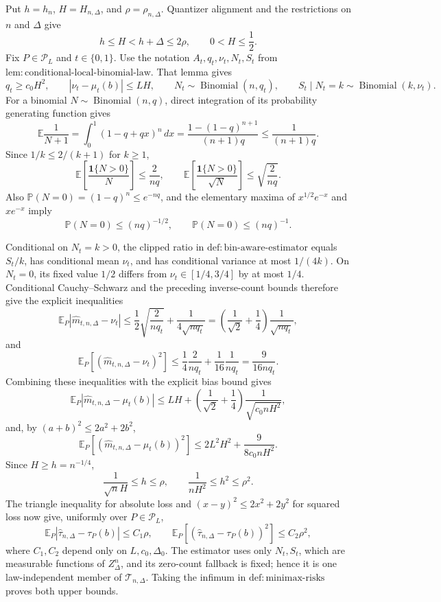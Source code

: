 Put \(h=h_n\), \(H=H_{n,\Delta}\), and \(\rho=\rho_{n,\Delta}\).  Quantizer alignment and the restrictions on \(n\) and \(\Delta\) give
\[
 h\leq H<h+\Delta\leq2\rho,
 \qquad 0<H\leq\frac12.
\]
Fix \(P\in\mathcal P_L\) and \(t\in\{0,1\}\).  Use the notation \(A_t,q_t,\nu_t,N_t,S_t\) from \(\mathrm{lem:conditional\text{-}local\text{-}binomial\text{-}law}\).  That lemma gives
\[
 q_t\geq c_0H^2,
 \qquad |\nu_t-\mu_t(b)|\leq LH,
 \qquad N_t\sim\operatorname{Binomial}(n,q_t),
 \qquad S_t\mid N_t=k\sim\operatorname{Binomial}(k,\nu_t).
\]
For a binomial \(N\sim\operatorname{Binomial}(n,q)\), direct integration of its probability generating function gives
\[
 \mathbb E\frac1{N+1}
 =\int_0^1(1-q+qx)^n\,dx
 =\frac{1-(1-q)^{n+1}}{(n+1)q}
 \leq\frac1{(n+1)q}.
\]
Since \(1/k\leq2/(k+1)\) for \(k\geq1\),
\[
 \mathbb E\!\left[\frac{\mathbf1\{N>0\}}N\right]\leq\frac2{nq},
 \qquad
 \mathbb E\!\left[\frac{\mathbf1\{N>0\}}{\sqrt N}\right]\leq\sqrt{\frac2{nq}}.
\]
Also \(\mathbb P(N=0)=(1-q)^n\leq e^{-nq}\), and the elementary maxima of \(x^{1/2}e^{-x}\) and \(xe^{-x}\) imply
\[
 \mathbb P(N=0)\leq(nq)^{-1/2},
 \qquad
 \mathbb P(N=0)\leq(nq)^{-1}.
\]

Conditional on \(N_t=k>0\), the clipped ratio in \(\mathrm{def:bin\text{-}aware\text{-}estimator}\) equals \(S_t/k\), has conditional mean \(\nu_t\), and has conditional variance at most \(1/(4k)\).  On \(N_t=0\), its fixed value \(1/2\) differs from \(\nu_t\in[1/4,3/4]\) by at most \(1/4\).  Conditional Cauchy--Schwarz and the preceding inverse-count bounds therefore give the explicit inequalities
\[
 \mathbb E_P|\widehat m_{t,n,\Delta}-\nu_t|
 \leq\frac12\sqrt{\frac2{nq_t}}+\frac1{4\sqrt{nq_t}}
 =\left(\frac1{\sqrt2}+\frac14\right)\frac1{\sqrt{nq_t}},
\]
and
\[
 \mathbb E_P[(\widehat m_{t,n,\Delta}-\nu_t)^2]
 \leq\frac14\frac2{nq_t}+\frac1{16}\frac1{nq_t}
 =\frac9{16nq_t}.
\]
Combining these inequalities with the explicit bias bound gives
\[
 \mathbb E_P|\widehat m_{t,n,\Delta}-\mu_t(b)|
 \leq LH+\left(\frac1{\sqrt2}+\frac14\right)\frac1{\sqrt{c_0nH^2}},
\]
and, by \((a+b)^2\leq2a^2+2b^2\),
\[
 \mathbb E_P[(\widehat m_{t,n,\Delta}-\mu_t(b))^2]
 \leq2L^2H^2+\frac9{8c_0nH^2}.
\]
Since \(H\geq h=n^{-1/4}\),
\[
 \frac1{\sqrt n H}\leq h\leq\rho,
 \qquad
 \frac1{nH^2}\leq h^2\leq\rho^2.
\]
The triangle inequality for absolute loss and \((x-y)^2\leq2x^2+2y^2\) for squared loss now give, uniformly over \(P\in\mathcal P_L\),
\[
 \mathbb E_P|\widehat\tau_{n,\Delta}-\tau_P(b)|\leq C_1\rho,
 \qquad
 \mathbb E_P[(\widehat\tau_{n,\Delta}-\tau_P(b))^2]\leq C_2\rho^2,
\]
where \(C_1,C_2\) depend only on \(L,c_0,\Delta_0\).  The estimator uses only \(N_t,S_t\), which are measurable functions of \(Z_\Delta^n\), and its zero-count fallback is fixed; hence it is one law-independent member of \(\mathcal T_{n,\Delta}\).  Taking the infimum in \(\mathrm{def:minimax\text{-}risks}\) proves both upper bounds.

